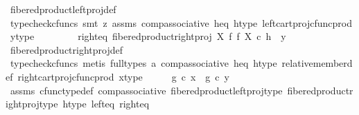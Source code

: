 \begin{isabellebody}
\ fibered{\isacharunderscore}{\kern0pt}product{\isacharunderscore}{\kern0pt}left{\isacharunderscore}{\kern0pt}proj{\isacharunderscore}{\kern0pt}def\isanewline
\ \ \ \ \ \ \isamarkupfalse%
\ {\isacharparenleft}{\kern0pt}typecheck{\isacharunderscore}{\kern0pt}cfuncs{\isacharcomma}{\kern0pt}\ smt\ {\isacharparenleft}{\kern0pt}z{}{\isacharparenright}{\kern0pt}\ assms{\isacharparenleft}{\kern0pt}{}{\isacharparenright}{\kern0pt}\ comp{\isacharunderscore}{\kern0pt}associative{}\ h{\isacharunderscore}{\kern0pt}eq\ h{\isacharunderscore}{\kern0pt}type\ left{\isacharunderscore}{\kern0pt}cart{\isacharunderscore}{\kern0pt}proj{\isacharunderscore}{\kern0pt}cfunc{\isacharunderscore}{\kern0pt}prod\ y{\isacharunderscore}{\kern0pt}type{\isacharparenright}{\kern0pt}\isanewline
\ \ \ \ \isanewline
\ \ \isamarkupfalse%
\ right{\isacharunderscore}{\kern0pt}eq{\isacharcolon}{\kern0pt}\ {\isachardoublequoteopen}fibered{\isacharunderscore}{\kern0pt}product{\isacharunderscore}{\kern0pt}right{\isacharunderscore}{\kern0pt}proj\ X\ f\ f\ X\ {\isasymcirc}\isactrlsub c\ h\ {\isacharequal}{\kern0pt}\ y{\isachardoublequoteclose}\isanewline
\ \ \ \ \isamarkupfalse%
\ fibered{\isacharunderscore}{\kern0pt}product{\isacharunderscore}{\kern0pt}right{\isacharunderscore}{\kern0pt}proj{\isacharunderscore}{\kern0pt}def\isanewline
\ \ \ \ \isamarkupfalse%
\ {\isacharparenleft}{\kern0pt}typecheck{\isacharunderscore}{\kern0pt}cfuncs{\isacharcomma}{\kern0pt}\ metis\ {\isacharparenleft}{\kern0pt}full{\isacharunderscore}{\kern0pt}types{\isacharparenright}{\kern0pt}\ a{}\ comp{\isacharunderscore}{\kern0pt}associative{}\ h{\isacharunderscore}{\kern0pt}eq\ h{\isacharunderscore}{\kern0pt}type\ relative{\isacharunderscore}{\kern0pt}member{\isacharunderscore}{\kern0pt}def{}\ right{\isacharunderscore}{\kern0pt}cart{\isacharunderscore}{\kern0pt}proj{\isacharunderscore}{\kern0pt}cfunc{\isacharunderscore}{\kern0pt}prod\ x{\isacharunderscore}{\kern0pt}type{\isacharparenright}{\kern0pt}\isanewline
\isanewline
\ \ \isamarkupfalse%
\ \isamarkupfalse%
\ {\isachardoublequoteopen}g\ {\isasymcirc}\isactrlsub c\ x\ {\isacharequal}{\kern0pt}\ g\ {\isasymcirc}\isactrlsub c\ y{\isachardoublequoteclose}\isanewline
\ \ \ \ \isamarkupfalse%
\ assms{\isacharparenleft}{\kern0pt}{}{\isacharcomma}{\kern0pt}{}{\isacharcomma}{\kern0pt}{}{\isacharparenright}{\kern0pt}\ cfunc{\isacharunderscore}{\kern0pt}type{\isacharunderscore}{\kern0pt}def\ comp{\isacharunderscore}{\kern0pt}associative\ fibered{\isacharunderscore}{\kern0pt}product{\isacharunderscore}{\kern0pt}left{\isacharunderscore}{\kern0pt}proj{\isacharunderscore}{\kern0pt}type\ fibered{\isacharunderscore}{\kern0pt}product{\isacharunderscore}{\kern0pt}right{\isacharunderscore}{\kern0pt}proj{\isacharunderscore}{\kern0pt}type\ h{\isacharunderscore}{\kern0pt}type\ left{\isacharunderscore}{\kern0pt}eq\ right{\isacharunderscore}{\kern0pt}eq\ \isamarkupfalse%

\end{isabellebody}
